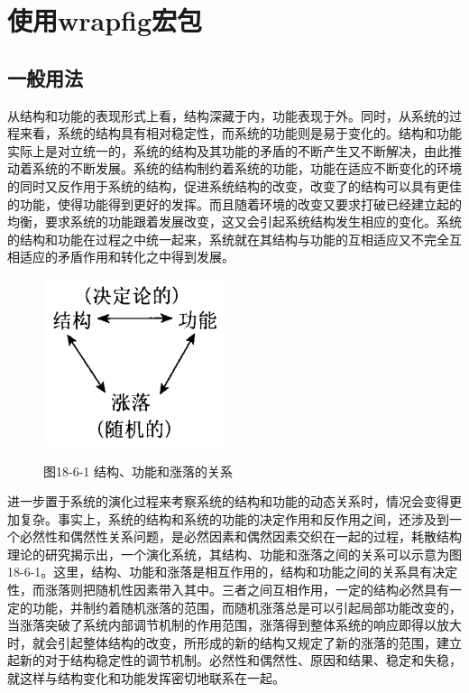 \documentclass[UTF8]{ctexart}
\begin{document}
  

\section{使用wrapfig宏包}


\subsection{一般用法}
从结构和功能的表现形式上看，结构深藏于内，功能表现于外。同时，从系统的过程来看，系统的结构具有相对稳定性，而系统的功能则是易于变化的。结构和功能实际上是对立统一的，系统的结构及其功能的矛盾的不断产生又不断解决，由此推动着系统的不断发展。系统的结构制约着系统的功能，功能在适应不断变化的环境的同时又反作用于系统的结构，促进系统结构的改变，改变了的结构可以具有更佳的功能，使得功能得到更好的发挥。而且随着环境的改变又要求打破已经建立起的均衡，要求系统的功能跟着发展改变，这又会引起系统结构发生相应的变化。系统的结构和功能在过程之中统一起来，系统就在其结构与功能的互相适应又不完全互相适应的矛盾作用和转化之中得到发展。

\begin{figure}
  \centering
  \includegraphics[width=.3\textwidth]{figure1.png}

  图18-6-1 结构、功能和涨落的关系
\end{figure}

进一步置于系统的演化过程来考察系统的结构和功能的动态关系时，情况会变得更加复杂。事实上，系统的结构和系统的功能的决定作用和反作用之间，还涉及到一个必然性和偶然性关系问题，是必然因素和偶然因素交织在一起的过程，耗散结构理论的研究揭示出，一个演化系统，其结构、功能和涨落之间的关系可以示意为图18-6-1。这里，结构、功能和涨落是相互作用的，结构和功能之间的关系具有决定性，而涨落则把随机性因素带入其中。三者之间互相作用，一定的结构必然具有一定的功能，并制约着随机涨落的范围，而随机涨落总是可以引起局部功能改变的，当涨落突破了系统内部调节机制的作用范围，涨落得到整体系统的响应即得以放大时，就会引起整体结构的改变，所形成的新的结构又规定了新的涨落的范围，建立起新的对于结构稳定性的调节机制。必然性和偶然性、原因和结果、稳定和失稳，就这样与结构变化和功能发挥密切地联系在一起。
\end{document}
